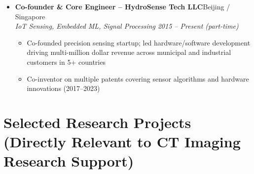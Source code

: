 \documentclass[letterpaper,10pt]{article}
\begin{document}
\begin{itemize}[leftmargin=0in, label={}]
  \vspace{3pt}

  \item
  \textbf{Co-founder \& Core Engineer -- HydroSense Tech LLC}\hfill Beijing / Singapore \\
  \textit{IoT Sensing, Embedded ML, Signal Processing} \hfill \textit{2015 -- Present (part-time)}
  \begin{itemize}[leftmargin=0.2in, topsep=1pt]
    \item Co-founded precision sensing startup; led hardware/software development driving multi-million dollar revenue across municipal and industrial customers in 5+ countries
    \item Co-inventor on multiple patents covering sensor algorithms and hardware innovations (2017--2023)
  \end{itemize}

\end{itemize}

\vspace{-2pt}

\section{Selected Research Projects (Directly Relevant to CT Imaging Research Support)}
\end{document}
